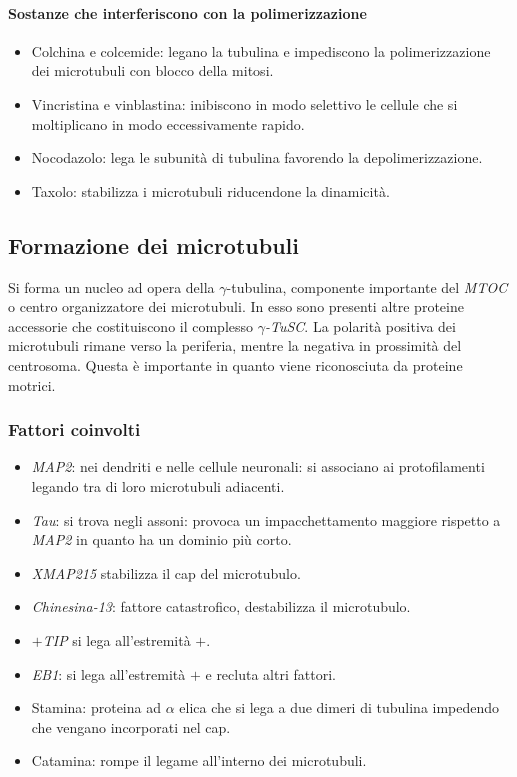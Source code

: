 			\paragraph{Sostanze che interferiscono con la polimerizzazione}
			\begin{multicols}{2}
				\begin{itemize}
					\item Colchina e colcemide: legano la tubulina e impediscono la polimerizzazione dei microtubuli con blocco della mitosi.
					\item Vincristina e vinblastina: inibiscono in modo selettivo le cellule che si moltiplicano in modo eccessivamente rapido.
					\item Nocodazolo: lega le subunit\`a di tubulina favorendo la depolimerizzazione.
					\item Taxolo: stabilizza i microtubuli riducendone la dinamicit\`a.
				\end{itemize}
			\end{multicols}
	
	\subsection{Formazione dei microtubuli}
	Si forma un nucleo ad opera della $\gamma$-tubulina, componente importante del \emph{MTOC} o centro organizzatore dei microtubuli.
	In esso sono presenti altre proteine accessorie che costituiscono il complesso \emph{$\gamma$-TuSC}.
	La polarit\`a positiva dei microtubuli rimane verso la periferia, mentre la negativa in prossimit\`a del centrosoma.
	Questa \`e importante in quanto viene riconosciuta da proteine motrici.

		\subsubsection{Fattori coinvolti}
		\begin{multicols}{2}
			\begin{itemize}
				\item \emph{MAP2}: nei dendriti e nelle cellule neuronali: si associano ai protofilamenti legando tra di loro microtubuli adiacenti.
				\item \emph{Tau}: si trova negli assoni: provoca un impacchettamento maggiore rispetto a \emph{MAP2} in quanto ha un dominio pi\`u corto.
				\item \emph{XMAP215} stabilizza il cap del microtubulo.
				\item \emph{Chinesina-13}: fattore catastrofico, destabilizza il microtubulo.
				\item \emph{$+$TIP} si lega all'estremit\`a $+$.
				\item \emph{EB1}: si lega all'estremit\`a $+$ e recluta altri fattori.
				\item Stamina: proteina ad $\alpha$ elica che si lega a due dimeri di tubulina impedendo che vengano incorporati nel cap.
				\item Catamina: rompe il legame all'interno dei microtubuli.
			\end{itemize}
		\end{multicols}

